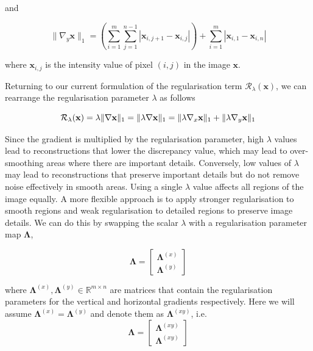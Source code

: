 \documentclass[12pt]{article}
\begin{document}
and

\begin{equation}
  \| \nabla_y \mathbf{x} \|_1 = \left( \sum_{i=1}^{m} \sum_{j=1}^{n-1} |\mathbf{x}_{i,j+1} - \mathbf{x}_{i,j}| \right) + \sum_{i=1}^{m} |\mathbf{x}_{i, 1} - \mathbf{x}_{i,n}|
\end{equation}


where $\mathbf{x}_{i,j}$ is the intensity value of pixel $(i,j)$ in the image $\mathbf{x}$. 

Returning to our current formulation of the regularisation term $\mathcal{R}_{\lambda}(\mathbf{x})$, we can rearrange the regularisation parameter $\lambda$ as follows

\begin{equation}
    \mathcal{R}_{\lambda}(\mathbf{x}) 
    = \lambda \| \nabla \mathbf{x} \|_1 \\
    = \| \lambda \nabla \mathbf{x} \|_1 \\
    = \| \lambda \nabla_x \mathbf{x} \|_1 + \| \lambda \nabla_y \mathbf{x} \|_1
\end{equation}

Since the gradient is multiplied by the regularisation parameter, high $\lambda$ values lead to reconstructions that lower the discrepancy value, which may lead to over-smoothing areas where there are important details. Conversely, low values of $\lambda$ 
may lead to reconstructions that preserve important details but do not remove noise effectively in smooth areas.
Using a single $\lambda$ value affects all regions of the image equally.
A more flexible approach is to
apply stronger regularisation to smooth regions and weak regularisation to detailed regions to preserve image details.
We can do this by swapping the scalar $\lambda$ with a regularisation parameter map $\mathbf{\Lambda}$,

\begin{equation}
  \mathbf{\Lambda} = \begin{bmatrix}
    \mathbf{\Lambda}^{(x)} \\
    \mathbf{\Lambda}^{(y)}
  \end{bmatrix}
\end{equation}

where $\mathbf{\Lambda}^{(x)}, \mathbf{\Lambda}^{(y)} \in \mathbb{R}^{m \times n}$ are matrices that contain the regularisation parameters for the vertical and horizontal gradients respectively.
Here we will assume $\mathbf{\Lambda}^{(x)} = \mathbf{\Lambda}^{(y)}$ and denote them as $\mathbf{\Lambda}^{(xy)}$, i.e.
\begin{equation}
  \mathbf{\Lambda} = \begin{bmatrix}
    \mathbf{\Lambda}^{(xy)} \\
    \mathbf{\Lambda}^{(xy)}
  \end{bmatrix}
\end{equation}
\end{document}
